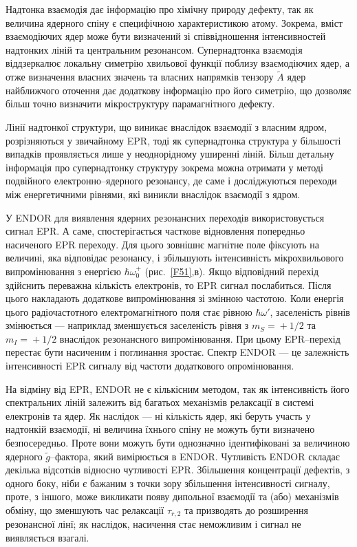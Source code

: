 Надтонка взаємодія дає інформацію про хімічну природу дефекту,
так як величина ядерного спіну є специфічною характеристикою атому.
Зокрема, вміст взаємодіючих ядер може бути визначений
зі співвідношення інтенсивностей надтонких ліній та центральним резонансом.
Супернадтонка взаємодія віддзеркалює локальну симетрію хвильової функції поблизу
взаємодіючих ядер, а отже визначення власних значень та власних
напрямків тензору $\tilde{A}$ ядер найближчого оточення дає додаткову інформацію
про його симетрію, що дозволяє більш точно визначити мікроструктуру
парамагнітного дефекту.

Лінії надтонкої структури, що виникає внаслідок взаємодії з власним ядром,
розрізняються у звичайному EPR, тоді як супернадтонка структура у більшості
випадків проявляється лише у неоднорідному уширенні ліній.
Більш детальну інформація про супернадтонку структуру зокрема можна отримати
у методі подвійного електронно--ядерного резонансу, де саме і
досліджуються переходи між енергетичними рівнями, які виникли внаслідок взаємодії з ядром.

У ENDOR для виявлення ядерних резонансних переходів використовується сигнал EPR.
А саме, спостерігається часткове відновлення попередньо насиченого EPR переходу.
Для цього зовнішнє магнітне поле фіксують на величині, яка
відповідає резонансу, і збільшують інтенсивність мікрохвильового випромінювання з енергією $\hbar\omega_0^+$ (рис.~\ref{F51},в).
Якщо відповідний перехід здійснить переважна кількість електронів,
то EPR сигнал послабиться.
Після цього накладають додаткове випромінювання
зі змінною частотою.
Коли енергія цього радіочастотного електромагнітного поля стає рівною $\hbar \omega'$,
заселеність рівнів змінюється --- наприклад
зменшується заселеність рівня з $m_S\!=\!+1/2$ та $m_I\!=\!+1/2$ внаслідок
резонансного випромінювання.
При цьому EPR--перехід перестає бути насиченим і поглинання зростає.
Спектр ENDOR --- це залежність інтенсивності EPR сигналу від частоти додаткового
опромінювання.

На відміну від EPR, ENDOR не є кількісним методом,
так як інтенсивність його спектральних ліній залежить від багатьох
механізмів релаксації в системі електронів та ядер.
Як наслідок --- ні кількість ядер, які беруть участь у надтонкій взаємодії,
ні величина їхнього спіну не можуть бути визначено безпосередньо.
Проте вони можуть бути однозначно ідентифіковані за величиною ядерного $\tilde{g}$--фактора,
який вимірюється в ENDOR.
Чутливість ENDOR складає декілька відсотків відносно чутливості EPR.
Збільшення концентрації дефектів, з одного боку, ніби є бажаним з точки зору збільшення інтенсивності сигналу,
проте, з іншого, може викликати  появу дипольної взаємодії та (або) механізмів обміну,
що зменшують час релаксації $\tau_{r,2}$ та призводять до розширення резонансної лінї;
як наслідок, насичення стає неможливим і сигнал не виявляється взагалі.